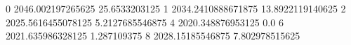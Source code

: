 0 2046.002197265625 25.6533203125
1 2034.2410888671875 13.8922119140625
2 2025.5616455078125 5.2127685546875
4 2020.348876953125 0.0
6 2021.635986328125 1.287109375
8 2028.15185546875 7.802978515625
